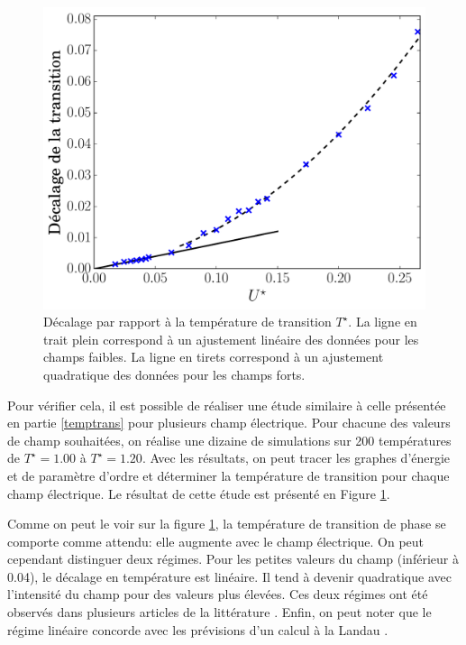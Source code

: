 \documentclass[11pt,a4paper]{article}
\numberwithin{equation}{section}
\begin{document}
\begin{figure}[h!]
    \centering      
    \includegraphics[scale=0.6]{figures/electricField.pdf}
    \caption{Décalage par rapport à la température de transition $T^\star$. La ligne en trait plein correspond à un ajustement linéaire des données pour les champs faibles. La ligne en tirets correspond à un ajustement quadratique des données pour les champs forts.}
        \label{electricField} 
\end{figure}

\newpage

Pour vérifier cela, il est possible de réaliser une étude similaire à celle présentée en partie \ref{temptrans} pour plusieurs champ électrique. Pour chacune des valeurs de champ souhaitées, on réalise une dizaine de simulations sur 200 températures de $T^\star = 1.00$ à $T^\star = 1.20$. Avec les résultats, on peut tracer les graphes d'énergie et de paramètre d'ordre et déterminer la température de transition pour chaque champ électrique. Le résultat de cette étude est présenté en Figure \ref{electricField}.
\medskip

Comme on peut le voir sur la figure \ref{electricField}, la température de transition de phase se comporte comme attendu: elle augmente avec le champ électrique. On peut cependant distinguer deux régimes. Pour les petites valeurs du champ (inférieur à 0.04), le décalage en température est linéaire. Il tend à devenir quadratique avec l'intensité du champ pour des valeurs plus élevées. Ces deux régimes ont été observés dans plusieurs articles de la littérature \cite{entropicelectric, field}. Enfin, on peut noter que le régime linéaire concorde avec les prévisions d'un calcul à la Landau \cite{landau}.
\end{document}
